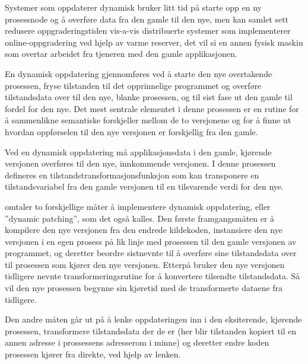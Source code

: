 Systemer som oppdaterer dynamisk bruker litt tid på starte opp en ny prosessnode og å overføre data fra den gamle til den nye, men kan samlet sett redusere oppgraderingstiden vis-a-vis distribuerte systemer som implementerer online-oppgradering ved hjelp av varme reserver, det vil si en annen fysisk maskin som overtar arbeidet fra tjeneren med den gamle applikasjonen.

En dynamisk oppdatering gjennomføres ved å starte den nye overtakende prosessen, fryse tilstanden til det opprinnelige programmet og overføre tilstandsdata over til den nye, blanke prosessen, og til sist fase ut den gamle til fordel for den nye. Det mest sentrale elementet i denne prosessen er en rutine for å sammenlikne semantiske forskjeller mellom de to versjonene og for å finne ut hvordan oppførselen til den nye versjonen er forskjellig fra den gamle.

Ved en dynamisk oppdatering må applikasjonsdata i den gamle, kjørende versjonen overføres til den nye, innkommende versjonen. I denne prosessen defineres en tilstandstransformasjonsfunksjon som kan transponere en tilstandsvariabel fra den gamle versjonen til en tilsvarende verdi for den nye.

\cite{hicks2005dsu} omtaler to forskjellige måter å implementere dynamisk oppdatering, eller ''dynamic patching'', som det også kalles. Den første framgangsmåten er å kompilere den nye versjonen fra den endrede kildekoden, instansiere den nye versjonen i en egen prosess på lik linje med prosessen til den gamle versjonen av programmet, og deretter beordre sistnevnte til å overføre sine tilstandsdata over til prosessen som kjører den nye versjonen. Etterpå bruker den nye versjonen tidligere nevnte transformeringsrutine for å konvertere tilsendte tilstandsdata. Så vil den nye prosessen begynne sin kjøretid med de transformerte dataene fra tidligere.

Den andre måten går ut på å lenke oppdateringen inn i den eksiterende, kjørende prosessen, transformere tilstandsdata der de er (her blir tilstanden kopiert til en annen adresse i prossessens adresserom i minne) og deretter endre koden prosessen kjører fra direkte, ved hjelp av lenken.
